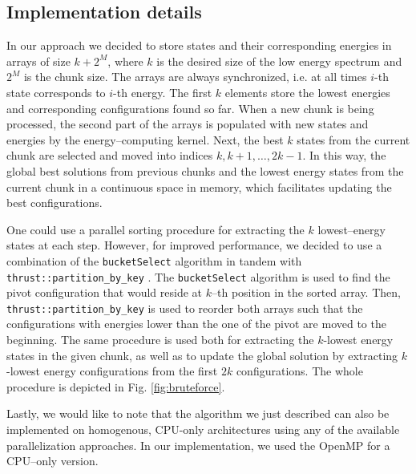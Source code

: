\subsection{Implementation details}

In our approach we decided to store states and their corresponding energies in
arrays of size $k+2^{M}$, where $k$ is the desired size of the low energy
spectrum and $2^{M}$ is the chunk size. The arrays are always synchronized,
i.e. at all times $i$-th state corresponds to $i$-th energy. The first $k$
elements store the lowest energies and corresponding configurations found so
far. When a new chunk is being processed, the second part of the arrays is
populated with new states and energies by the energy--computing kernel. Next,
the best $k$ states from the current chunk are selected and moved into indices
$k, k+1,\ldots,2k-1$. In this way, the global best solutions from previous
chunks and the lowest energy states from the current chunk in a continuous
space in memory, which facilitates updating the best configurations.

One could use a parallel sorting procedure for extracting the $k$
lowest--energy states at each step. However, for improved performance, we
decided to use a combination of the \texttt{bucketSelect} \cite{bucketselect}
algorithm in tandem with \texttt{thrust::partition\_by\_key} \cite{thrust}. The
\texttt{bucketSelect} algorithm is used to find the pivot configuration that
would reside at $k$--th position in the sorted array. Then,
\texttt{thrust::partition\_by\_key} is used to reorder both arrays such that
the configurations with energies lower than the one of the pivot are moved to
the beginning. The same procedure is used both for extracting the $k$-lowest
energy states in the given chunk, as well as to update the global solution by
extracting $k$-lowest energy configurations from the first $2k$ configurations.
The whole procedure is depicted in Fig. \ref{fig:bruteforce}.

Lastly, we would like to note that the algorithm we just described can also be
implemented on homogenous, CPU-only architectures using any of the available
parallelization approaches. In our implementation, we used the
OpenMP\cite{openmp} for a CPU--only version.

